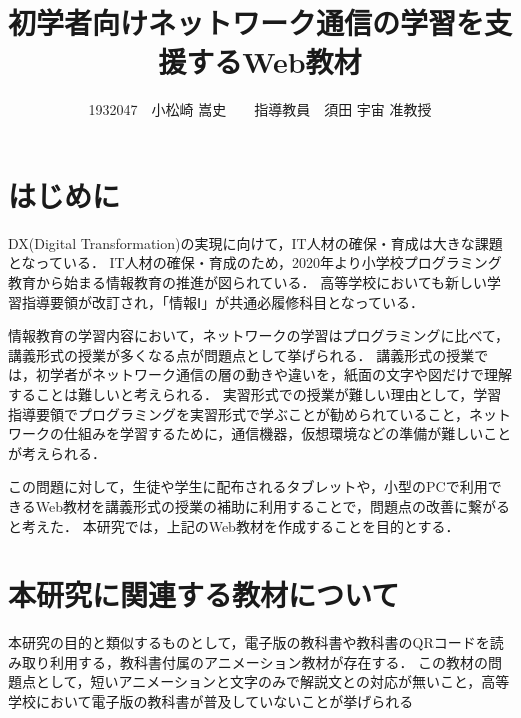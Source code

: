 \documentclass[twocolumn,10pt,a4j]{ltjsarticle}
\title{初学者向けネットワーク通信の学習を支援するWeb教材}
\author{1932047　小松崎 嵩史　　指導教員　須田 宇宙 准教授}
\date{}
\begin{document}
\maketitle

\section{はじめに}

DX(Digital Transformation)の実現に向けて，IT人材の確保・育成は大きな課題となっている\cite{dx}．
IT人材の確保・育成のため，2020年より小学校プログラミング教育から始まる情報教育の推進が図られている．
高等学校においても新しい学習指導要領が改訂され，「情報Ⅰ」が共通必履修科目となっている．


情報教育の学習内容において，ネットワークの学習はプログラミングに比べて，講義形式の授業が多くなる点が問題点として挙げられる．
講義形式の授業では，初学者がネットワーク通信の層の動きや違いを，紙面の文字や図だけで理解することは難しいと考えられる．
実習形式での授業が難しい理由として，学習指導要領でプログラミングを実習形式で学ぶことが勧められていること，ネットワークの仕組みを学習するために，通信機器，仮想環境などの準備が難しいことが考えられる．

この問題に対して，生徒や学生に配布されるタブレットや，小型のPCで利用できるWeb教材を講義形式の授業の補助に利用することで，問題点の改善に繋がると考えた．
本研究では，上記のWeb教材を作成することを目的とする．

\section{本研究に関連する教材について}
本研究の目的と類似するものとして，電子版の教科書や教科書のQRコードを読み取り利用する，教科書付属のアニメーション教材が存在する．
この教材の問題点として，短いアニメーションと文字のみで解説文との対応が無いこと，高等学校において電子版の教科書が普及していないことが挙げられる
\end{document}
